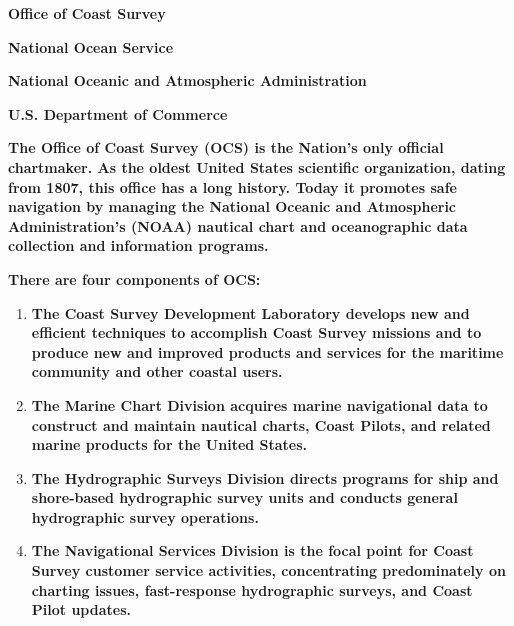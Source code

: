\documentclass[12pt,english]{article}
\begin{document}
\begin{center}
\textbf{Office of Coast Survey}

\textbf{National Ocean Service}

\textbf{National Oceanic and Atmospheric Administration}

\textbf{U.S. Department of Commerce}
\end{center}

\medskip{}

\noindent \textbf{The Office of Coast Survey (OCS) is the Nation’s only official chartmaker. As the oldest United States scientific organization, dating from 1807, this office has a long history. Today it promotes safe navigation by managing the National Oceanic and Atmospheric Administration’s (NOAA) nautical chart and oceanographic data collection and information programs.}

\medskip{}

\noindent \textbf{There are four components of OCS:}
\begin{enumerate}
\item \textbf{The Coast Survey Development Laboratory develops new and efficient techniques to accomplish Coast Survey missions and to produce new and improved products and services for the maritime community and other coastal users.}
\item \textbf{The Marine Chart Division acquires marine navigational data to construct and maintain nautical charts, Coast Pilots, and related marine products for the United States.}
\item \textbf{The Hydrographic Surveys Division directs programs for ship and shore-based hydrographic survey units and conducts general hydrographic survey operations.}
\item \textbf{The Navigational Services Division is the focal point for Coast Survey customer service activities, concentrating predominately on charting issues, fast-response hydrographic surveys, and Coast Pilot updates.}
\end{enumerate}

\vspace*{\fill}

\thispagestyle{empty}

\newpage{}

\setcounter{page}{1}

\maketitle
\end{document}
